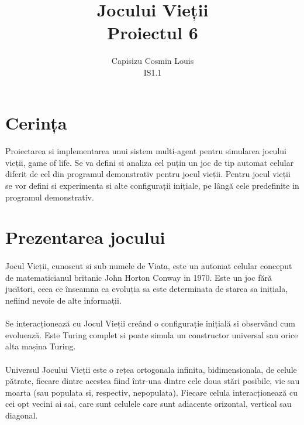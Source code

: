 \documentclass[11pt ,A4]{article}
\title{Jocului Vieții\\Proiectul 6}
\author{Capisizu Cosmin Louis\\IS1.1} %
\begin{document}
    \maketitle %
    \pagebreak

    \section{Cerința} %
        \paragraph{}
            Proiectarea si implementarea unui sistem multi-agent pentru simularea jocului vieții, game of life. Se va defini si analiza cel puțin un joc de tip automat celular diferit de cel din programul demonstrativ pentru jocul vieții. Pentru jocul vieții se vor defini si experimenta si alte configurații inițiale, pe lângă cele predefinite in programul demonstrativ.

    \section{Prezentarea jocului}

        \paragraph{}Jocul Vieții, cunoscut si sub numele de Viata, este un automat celular conceput de matematicianul britanic John Horton Conway in 1970. Este un joc fără jucători, ceea ce înseamna ca evoluția sa este determinata de starea sa inițiala, nefiind nevoie de alte informații.

        \paragraph{} Se interacționează cu Jocul Vieții creând o configurație inițială si observând cum evoluează. Este Turing complet si poate simula un constructor universal sau orice alta mașina Turing.

        \paragraph{} Universul Jocului Vieții este o rețea ortogonala infinita, bidimensionala, de celule pătrate, fiecare dintre acestea fiind într-una dintre cele doua stări posibile, vie sau moarta (sau populata si, respectiv, nepopulata). Fiecare celula interacționează cu cei opt vecini ai sai, care sunt celulele care sunt adiacente orizontal, vertical sau diagonal.
\end{document}
